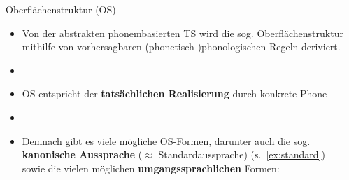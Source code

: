 
\begin{frame}{Oberflächenstruktur (OS)}

\begin{itemize}
	\item Von der abstrakten phonembasierten TS wird die sog. Oberflächenstruktur mithilfe von vorhersagbaren (phonetisch-)phonologischen Regeln deriviert.
	\item[]
	\item OS entspricht der \textbf{tatsächlichen Realisierung} durch konkrete Phone \ras \textipa{[ ]}
	\item[]
	\item Demnach gibt es viele mögliche OS-Formen, darunter auch die sog.\\
		\textbf{kanonische Aussprache} ($\approx$ Standardaussprache) (s.~\ref{ex:standard})\\
		sowie die vielen möglichen \textbf{umgangssprachlichen} Formen:

\eal
\ex \label{ex:standard} \textipa{[Pe:b@n]}
\ex \textipa{[Pe:bn]}
\ex \textipa{[Pe:bm]}
\ex \textipa{[Pe:m]}
\zl
\end{itemize}

\end{frame}


